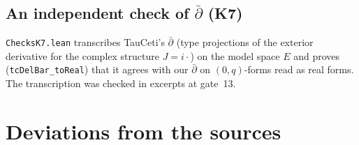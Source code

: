 \documentclass[11pt,a4paper]{article}
\newcommand{\code}[1]{\texttt{#1}}
\newcommand{\dbar}{\bar\partial}
\begin{document}
\subsection{\texorpdfstring{An independent check of $\dbar$ (K7)}{An independent check of dbar (K7)}}\label{sec:k7}
\code{ChecksK7.lean} transcribes TauCeti's $\bar\partial$ \cite{TauCeti} (type projections of the exterior
derivative for the complex structure $J=i\cdot$) on the model space $E$ and proves
(\code{tcDelBar\_toReal}) that it agrees with our $\dbar$ on $(0,q)$-forms read as real forms. The
transcription was checked in excerpts at gate~13.

\section{Deviations from the sources}
\end{document}
